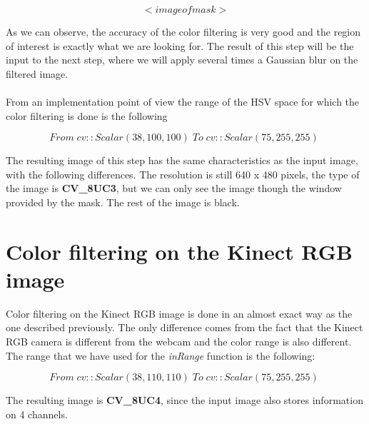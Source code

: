 $$ <image of mask> $$

\noindent
As we can observe, the accuracy of the color filtering is very good and the region of interest is exactly what we are looking for. The result of this step will be the input to the next step, where we will apply several times a Gaussian blur on the filtered image. 
\\\\
From an implementation point of view the range of the HSV space for which the color filtering is done is the following

$$ From \; cv::Scalar(38 , 100 , 100) \; To \; cv::Scalar(75 ,255 ,255 ) \; $$

\noindent
The resulting image of this step has the same characteristics as the input image, with the following differences. The resolution is still 640 x 480 pixels, the type of the image is {\bf CV\_8UC3}, but we can only see the image though the window provided by the mask. The rest of the image is black. 

\section{Color filtering on the Kinect RGB image}
\noindent
Color filtering on the Kinect RGB image is done in an almost exact way as the one described previously. The only difference comes from the fact that the Kinect RGB camera is different from the webcam and the color range is also different. 
\\
The range that we have used for the \emph{inRange} function is the following:

$$ From \; cv::Scalar(38 , 110 , 110) \; To \; cv::Scalar(75 ,255 ,255 ) \; $$

\noindent
The resulting image is {\bf CV\_8UC4}, since the input image also stores information on 4 channels. 

